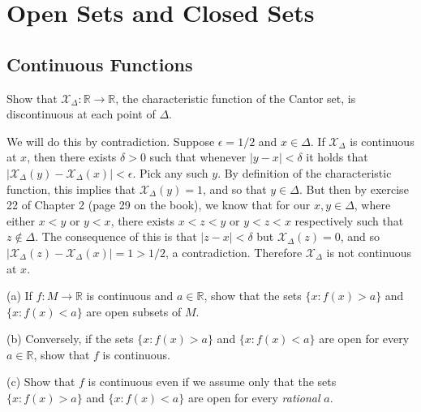 \chapter{Open Sets and Closed Sets}

\section{Continuous Functions}

\begin{exercise}{4}
    Show that $\mathcal{X}_\Delta : \mathbb{R} \rightarrow \mathbb{R}$, the characteristic function of the Cantor set, is discontinuous at each point of $\Delta$.
\end{exercise}

\begin{solution}
    
    We will do this by contradiction.
    Suppose $\epsilon = 1/2$ and $x \in \Delta$.
    If $\mathcal{X}_\Delta$ is continuous at $x$, then there exists $\delta > 0$ such that whenever $\lvert y - x \rvert < \delta$ it holds that $\lvert \mathcal{X}_\Delta(y) -\mathcal{X}_\Delta(x) \rvert < \epsilon$.
    Pick any such $y$.
    By definition of the characteristic function, this implies that $\mathcal{X}_\Delta(y) = 1$, and so that $y \in \Delta$.
    But then by exercise 22 of Chapter 2 (page 29 on the book), we know that for our $x, y \in \Delta$, where either $x < y$ or $y < x$, there exists $x < z < y$ or $y < z < x$ respectively such that $z \notin \Delta$.
    The consequence of this is that $\lvert z - x \rvert < \delta$ but $\mathcal{X}_\Delta(z) = 0$, and so $\lvert \mathcal{X}_\Delta(z) - \mathcal{X}_\Delta(x) \rvert = 1 > 1/2$, a contradiction.
    Therefore $\mathcal{X}_\Delta$ is not continuous at $x$.
\end{solution}

\begin{exercise}{7}
    (a) If $f: M \rightarrow \mathbb{R}$ is continuous and $a \in \mathbb{R}$, show that the sets $\{x: f(x) > a\}$ and $\{x: f(x) < a\}$ are open subsets of $M$.

    (b) Conversely, if the sets $\{x: f(x) > a\}$ and $\{x: f(x) < a\}$ are open for every $a \in \mathbb{R}$, show that $f$ is continuous.

    (c) Show that $f$ is continuous even if we assume only that the sets $\{x: f(x) > a\}$ and $\{x: f(x) < a\}$ are open for every \textit{rational} $a$.
\end{exercise}

